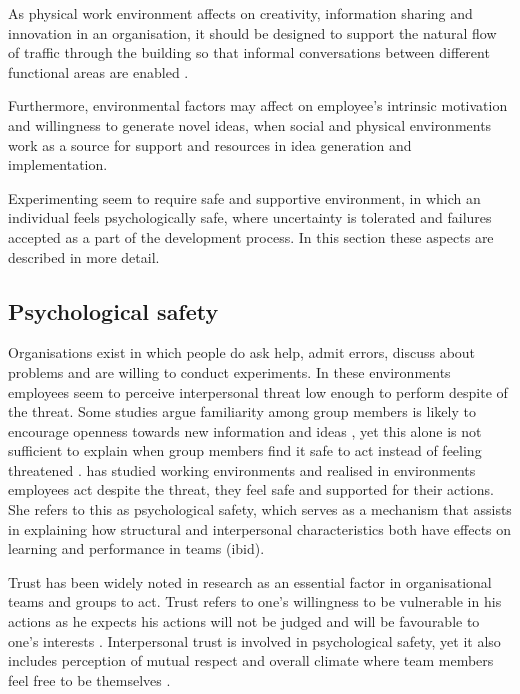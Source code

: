 As physical work environment affects on creativity, information sharing and innovation in an organisation, it should be designed to support the natural flow of traffic through the building so that informal conversations between different functional areas are enabled \citep{shalley2004leaders}. 

Furthermore, environmental factors may affect on employee's intrinsic motivation and willingness to generate novel ideas, when social and physical environments work as a source for support and resources in idea generation and implementation. \citep{amabile1998kill,mumford1988creativity}

Experimenting seem to require safe and supportive environment, in which an individual feels psychologically safe, where uncertainty is tolerated and failures accepted as a part of the development process. In this section these aspects are described in more detail.  

\subsection{Psychological safety}
Organisations exist in which people do ask help, admit errors, discuss about problems and are willing to conduct experiments. In these environments employees seem to perceive interpersonal threat low enough to perform despite of the threat. Some studies argue familiarity among group members is likely to encourage openness towards new information and ideas \citep{sanna1990valence}, yet this alone is not sufficient to explain when group members find it safe to act instead of feeling threatened \citep{edmondson1999psychological}. \citet{edmondson1999psychological} has studied working environments and realised in environments employees act despite the threat, they feel safe and supported for their actions. She refers to this as psychological safety, which serves as a mechanism that assists in explaining how structural and interpersonal characteristics both have effects on learning and performance in teams (ibid).  

Trust has been widely noted in research as an essential factor in organisational teams and groups to act\citep{golembiewski1975centrality,kramer1999trust,shalley2004leaders,edmondson1999psychological}. Trust refers to one's willingness to be vulnerable in his actions as he expects his actions will not be judged and will be favourable to one's interests \citep{robinson1997corporate}. Interpersonal trust is involved in psychological safety, yet it also includes perception of mutual respect and overall climate where team members feel free to be themselves \citep{edmondson1999psychological}. 

